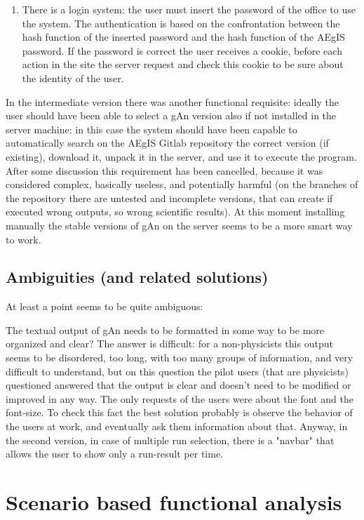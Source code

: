 \begin{enumerate}
\item There is a login system: the user must insert the password of the office to use the system. The authentication is based on the confrontation between the hash function of the inserted password and the hash function of the AEgIS password. If the password is correct the user receives a cookie, before each action in the site the server request and check this cookie to be sure about the identity of the user.  

\end{enumerate}

In the intermediate version there was another functional requisite: ideally the user should have been able to select a gAn version also if not installed in the server machine: in this case the system should have been capable to automatically search on the AEgIS Gitlab repository the correct version (if existing), download it, unpack it in the server, and use it to execute the program. 
After some discussion this requirement has been cancelled, because it was considered complex, basically useless, and potentially harmful (on the branches of the repository there are untested and incomplete versions, that can create if executed wrong outputs, so wrong scientific results). At this moment installing manually the stable versions of gAn on the server seems to be a more smart way to work.


\subsection{Ambiguities (and related solutions)}

At least a point seems to be quite ambiguous: 

The textual output of gAn needs to be formatted in some way to be more organized and clear? 
The answer is difficult: for a non-physicists this output seems to be disordered, too long, with too many groups of information, and very difficult to understand, but on this question the pilot users (that are physicists) questioned answered that the output is clear and doesn't need to be modified or improved in any way. The only requests of the users were about the font and the font-size. To check this fact the best solution probably is observe the behavior of the users at work, and eventually ask them information about that.
Anyway, in the second version, in case of multiple run selection, there is a "navbar" that allows the user to show only a run-result per time.


\section{Scenario based functional analysis}

